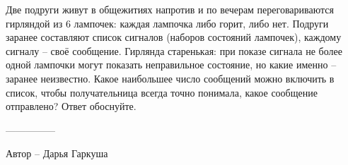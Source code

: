 \question
Две подруги живут в общежитиях напротив и по вечерам переговариваются гирляндой из $6$ лампочек: каждая лампочка либо горит, либо нет. Подруги заранее составляют список сигналов (наборов состояний лампочек), каждому сигналу -- своё сообщение. Гирлянда старенькая: при показе сигнала не более одной лампочки могут показать неправильное состояние, но какие именно -- заранее неизвестно. Какое наибольшее число сообщений можно включить в список, чтобы получательница всегда точно понимала, какое сообщение отправлено? Ответ обоснуйте.

---------------

Автор -- Дарья Гаркуша